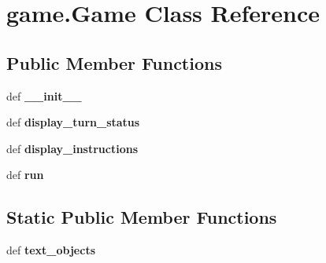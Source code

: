 \hypertarget{classgame_1_1Game}{\section{game.\-Game Class Reference}
\label{classgame_1_1Game}
}
\subsection*{Public Member Functions}
\begin{DoxyCompactItemize}
\item 
\hypertarget{classgame_1_1Game_a8f52bb5e9eb9b75037d03347e21be0c5}{def {\bfseries \-\_\-\-\_\-init\-\_\-\-\_\-}}\label{classgame_1_1Game_a8f52bb5e9eb9b75037d03347e21be0c5}

\item 
\hypertarget{classgame_1_1Game_a57dd6c67fa5932339f29c67a7b20c2e4}{def {\bfseries display\-\_\-turn\-\_\-status}}\label{classgame_1_1Game_a57dd6c67fa5932339f29c67a7b20c2e4}

\item 
\hypertarget{classgame_1_1Game_ad6242e522d0dd0c4ec2d211ddc3202a8}{def {\bfseries display\-\_\-instructions}}\label{classgame_1_1Game_ad6242e522d0dd0c4ec2d211ddc3202a8}

\item 
\hypertarget{classgame_1_1Game_a19f1db5c572b4e6388fa38dc3c45d596}{def {\bfseries run}}\label{classgame_1_1Game_a19f1db5c572b4e6388fa38dc3c45d596}

\end{DoxyCompactItemize}
\subsection*{Static Public Member Functions}
\begin{DoxyCompactItemize}
\item 
\hypertarget{classgame_1_1Game_af3d3ad5543afe057a3ff1d8056001922}{def {\bfseries text\-\_\-objects}}\label{classgame_1_1Game_af3d3ad5543afe057a3ff1d8056001922}

\end{DoxyCompactItemize}
